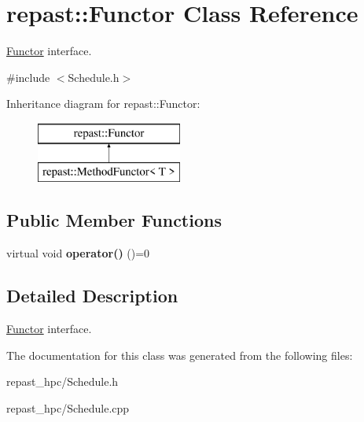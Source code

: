 \hypertarget{classrepast_1_1_functor}{\section{repast\-:\-:Functor Class Reference}
\label{classrepast_1_1_functor}
}


\hyperlink{classrepast_1_1_functor}{Functor} interface.  




{\ttfamily \#include $<$Schedule.\-h$>$}

Inheritance diagram for repast\-:\-:Functor\-:\begin{figure}[H]
\begin{center}
\leavevmode
\includegraphics[height=2.000000cm]{classrepast_1_1_functor}
\end{center}
\end{figure}
\subsection*{Public Member Functions}
\begin{DoxyCompactItemize}
\item 
\hypertarget{classrepast_1_1_functor_adadfddb7b4d7da5f105287498ff4d7d8}{virtual void {\bfseries operator()} ()=0}\label{classrepast_1_1_functor_adadfddb7b4d7da5f105287498ff4d7d8}

\end{DoxyCompactItemize}


\subsection{Detailed Description}
\hyperlink{classrepast_1_1_functor}{Functor} interface. 

The documentation for this class was generated from the following files\-:\begin{DoxyCompactItemize}
\item 
repast\-\_\-hpc/Schedule.\-h\item 
repast\-\_\-hpc/Schedule.\-cpp\end{DoxyCompactItemize}
